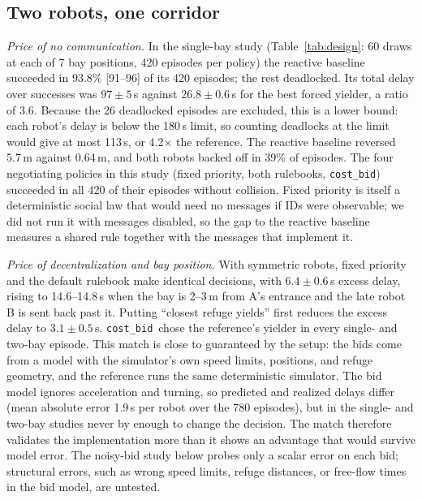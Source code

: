 \documentclass[letterpaper,journal]{IEEEtran}
\newcommand{\cb}{\texttt{cost\_bid}}
\begin{document}
\subsection{Two robots, one corridor}\label{sec:two}
\emph{Price of no communication.} In the single-bay study (Table~\ref{tab:design}: 60 draws at each of 7 bay positions, 420 episodes per policy) the reactive baseline succeeded in 93.8\% [91--96] of its 420 episodes; the rest deadlocked. Its total delay over successes was $97\pm5$\,s against $26.8\pm0.6$\,s for the best forced yielder, a ratio of 3.6. Because the 26 deadlocked episodes are excluded, this is a lower bound: each robot's delay is below the 180\,s limit, so counting deadlocks at the limit would give at most 113\,s, or 4.2$\times$ the reference. The reactive baseline reversed 5.7\,m against 0.64\,m, and both robots backed off in 39\% of episodes. The four negotiating policies in this study (fixed priority, both rulebooks, \cb) succeeded in all 420 of their episodes without collision. Fixed priority is itself a deterministic social law that would need no messages if IDs were observable; we did not run it with messages disabled, so the gap to the reactive baseline measures a shared rule together with the messages that implement it.

\emph{Price of decentralization and bay position.} With symmetric robots, fixed priority and the default rulebook make identical decisions, with $6.4\pm0.6$\,s excess delay, rising to 14.6--14.8\,s when the bay is 2--3\,m from A's entrance and the late robot B is sent back past it. Putting ``closest refuge yields'' first reduces the excess delay to $3.1\pm0.5$\,s. \cb\ chose the reference's yielder in every single- and two-bay episode. This match is close to guaranteed by the setup: the bids come from a model with the simulator's own speed limits, positions, and refuge geometry, and the reference runs the same deterministic simulator. The bid model ignores acceleration and turning, so predicted and realized delays differ (mean absolute error 1.9\,s per robot over the 780 episodes), but in the single- and two-bay studies never by enough to change the decision. %
The match therefore validates the implementation more than it shows an advantage that would survive model error. The noisy-bid study below probes only a scalar error on each bid; structural errors, such as wrong speed limits, refuge distances, or free-flow times in the bid model, are untested.
\end{document}
